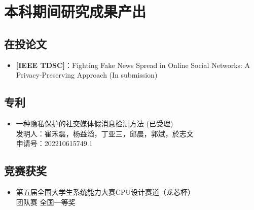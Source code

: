 
\chapter*{本科期间研究成果产出}

\section*{在投论文}

\begin{itemize}
\item 
\textbf{[IEEE TDSC]}：Fighting Fake News Spread in Online Social Networks: A Privacy-Preserving Approach (In submission)

\end{itemize}

\section*{专利}

\begin{itemize}
    \item 一种隐私保护的社交媒体假消息检测方法 (已受理) \\ 发明人：崔禾磊，杨益滔，丁亚三，邱晨，郭斌，於志文 \\ 申请号：202210615749.1 
\end{itemize}

\section*{竞赛获奖}

\begin{itemize}
    \item 第五届全国大学生系统能力大赛CPU设计赛道（龙芯杯）\\ 团队赛 全国一等奖
\end{itemize}

\clearpage
\endinput